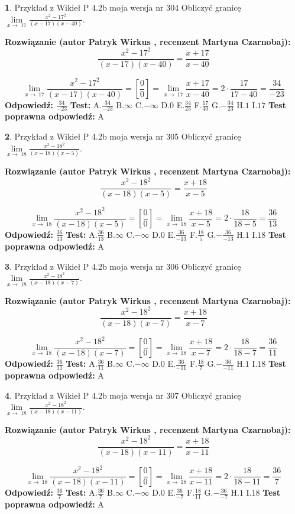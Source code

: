 \documentclass[12pt, a4paper]{article}
\theoremstyle{definition} %
\newtheorem{zad}{}
\newcommand{\zadStart}[1]{\begin{zad}#1\newline}
\newcommand{\zadStop}{\end{zad}}
\newcommand{\rozwStart}[2]{\noindent \textbf{Rozwiązanie (autor #1 , recenzent #2): }\newline}
\newcommand{\rozwStop}{\newline}
\newcommand{\odpStart}{\noindent \textbf{Odpowiedź:}\newline}
\newcommand{\odpStop}{\newline}
\newcommand{\testStart}{\noindent \textbf{Test:}\newline}
\newcommand{\testStop}{\newline}
\newcommand{\kluczStart}{\noindent \textbf{Test poprawna odpowiedź:}\newline}
\newcommand{\kluczStop}{\newline}
\begin{document}
\zadStart{Przykład z Wikieł P 4.2b moja wersja nr 304}
Obliczyć granicę $\lim\limits_{x\to\ 17}\frac{x^{2}-17^{2}}{(x-17)(x-40)}$.
\zadStop
\rozwStart{Patryk Wirkus}{Martyna Czarnobaj}
$$\frac{x^{2}-17^{2}}{(x-17)(x-40)}=\frac{x+17}{x-40}$$

$$\lim\limits_{x\to\ 17}\frac{x^{2}-17^{2}}{(x-17)(x-40)}=[\frac{0}{0}]=\lim\limits_{x\to\ 17}\frac{x+17}{x-40}=2 \cdot \frac{17}{17-40} = \frac{34}{-23}$$
\rozwStop
\odpStart
$\frac{34}{-23}$
\odpStop
\testStart
A.$\frac{34}{-23}$
B.$\infty$
C.$-\infty$
D.$0$
E.$\frac{34}{23}$
F.$\frac{17}{40}$
G.$-\frac{34}{23}$
H.$1$
I.$17$
\testStop
\kluczStart
A
\kluczStop



\zadStart{Przykład z Wikieł P 4.2b moja wersja nr 305}
Obliczyć granicę $\lim\limits_{x\to\ 18}\frac{x^{2}-18^{2}}{(x-18)(x-5)}$.
\zadStop
\rozwStart{Patryk Wirkus}{Martyna Czarnobaj}
$$\frac{x^{2}-18^{2}}{(x-18)(x-5)}=\frac{x+18}{x-5}$$

$$\lim\limits_{x\to\ 18}\frac{x^{2}-18^{2}}{(x-18)(x-5)}=[\frac{0}{0}]=\lim\limits_{x\to\ 18}\frac{x+18}{x-5}=2 \cdot \frac{18}{18-5} = \frac{36}{13}$$
\rozwStop
\odpStart
$\frac{36}{13}$
\odpStop
\testStart
A.$\frac{36}{13}$
B.$\infty$
C.$-\infty$
D.$0$
E.$\frac{36}{-13}$
F.$\frac{18}{5}$
G.$-\frac{36}{-13}$
H.$1$
I.$18$
\testStop
\kluczStart
A
\kluczStop



\zadStart{Przykład z Wikieł P 4.2b moja wersja nr 306}
Obliczyć granicę $\lim\limits_{x\to\ 18}\frac{x^{2}-18^{2}}{(x-18)(x-7)}$.
\zadStop
\rozwStart{Patryk Wirkus}{Martyna Czarnobaj}
$$\frac{x^{2}-18^{2}}{(x-18)(x-7)}=\frac{x+18}{x-7}$$

$$\lim\limits_{x\to\ 18}\frac{x^{2}-18^{2}}{(x-18)(x-7)}=[\frac{0}{0}]=\lim\limits_{x\to\ 18}\frac{x+18}{x-7}=2 \cdot \frac{18}{18-7} = \frac{36}{11}$$
\rozwStop
\odpStart
$\frac{36}{11}$
\odpStop
\testStart
A.$\frac{36}{11}$
B.$\infty$
C.$-\infty$
D.$0$
E.$\frac{36}{-11}$
F.$\frac{18}{7}$
G.$-\frac{36}{-11}$
H.$1$
I.$18$
\testStop
\kluczStart
A
\kluczStop



\zadStart{Przykład z Wikieł P 4.2b moja wersja nr 307}
Obliczyć granicę $\lim\limits_{x\to\ 18}\frac{x^{2}-18^{2}}{(x-18)(x-11)}$.
\zadStop
\rozwStart{Patryk Wirkus}{Martyna Czarnobaj}
$$\frac{x^{2}-18^{2}}{(x-18)(x-11)}=\frac{x+18}{x-11}$$

$$\lim\limits_{x\to\ 18}\frac{x^{2}-18^{2}}{(x-18)(x-11)}=[\frac{0}{0}]=\lim\limits_{x\to\ 18}\frac{x+18}{x-11}=2 \cdot \frac{18}{18-11} = \frac{36}{7}$$
\rozwStop
\odpStart
$\frac{36}{7}$
\odpStop
\testStart
A.$\frac{36}{7}$
B.$\infty$
C.$-\infty$
D.$0$
E.$\frac{36}{-7}$
F.$\frac{18}{11}$
G.$-\frac{36}{-7}$
H.$1$
I.$18$
\testStop
\kluczStart
A
\kluczStop
\end{document}
